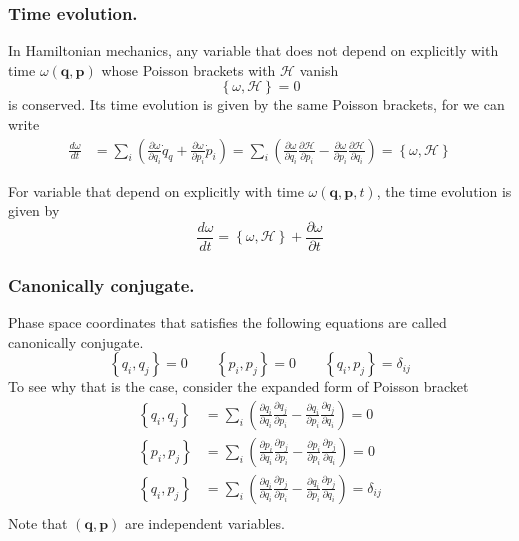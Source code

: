 \documentclass[../../../main.tex]{subfiles}
\begin{document}
\subsubsection{Time evolution.}
In Hamiltonian mechanics, any variable that does not depend on explicitly with time $\omega(\mathbf{q},\mathbf{p}) 	$ whose Poisson brackets with $\mathcal{H }$ vanish
\begin{equation*}
	\left\{ \omega,\mathcal{H } \right\}=0
\end{equation*}
is conserved.
Its time evolution is given by the same Poisson brackets, for we can write
\begin{align*}
	\frac{d \omega}{dt} & = \sum_i \left( \frac{\partial \omega }{\partial q_i }\dot{q}_q+\frac{\partial \omega }{\partial p_i}\dot{p}_i \right) = \sum_i \left( \frac{\partial \omega }{\partial q_i }\frac{\partial \mathcal{H}}{\partial p_i 	}-\frac{\partial\omega }{\partial p_i }\frac{\partial \mathcal{H }}{\partial q_i } \right) =\left\{ \omega,\mathcal{H} \right\}
\end{align*}

For variable that depend on explicitly with time $\omega(\mathbf{q}, \mathbf{p },t )$, the time evolution is given by
\begin{equation*}
	\frac{d \omega }{dt}=\left\{ \omega,\mathcal{H } \right\}+\frac{\partial \omega }{\partial t}
\end{equation*}

\subsubsection{Canonically conjugate.}
Phase space coordinates that satisﬁes the following equations are called canonically conjugate.
\begin{equation*}
	\left\{ q_i,q_j  \right\}=0\qquad \left\{ p_i,p_j  \right\}=0\qquad \left\{ q_i,p_j  \right\}=\delta_{ij}
\end{equation*}
To see why that is the case, consider the expanded form of Poisson bracket
\begin{align*}
	\left\{ q_i,q_j  \right\} & = \sum_i \left( \frac{\partial q_i}{\partial q_i }\frac{\partial q_j }{\partial p_i }-\frac{\partial q_i }{\partial p_i }\frac{\partial q_j }{\partial q_i} \right) =0           \\
	\left\{ p_i,p_j  \right\} & = \sum_i \left( \frac{\partial p_i}{\partial q_i }\frac{\partial p_j }{\partial p_i }-\frac{\partial p_i }{\partial p_i }\frac{\partial p_j }{\partial q_i} \right) =0           \\
	\left\{ q_i,p_j  \right\} & = \sum_i \left( \frac{\partial q_i}{\partial q_i }\frac{\partial p_j }{\partial p_i }-\frac{\partial q_i }{\partial p_i }\frac{\partial p_j }{\partial q_i} \right) =\delta_{ij} \\
\end{align*}
Note that $(\mathbf{q },\mathbf{p })$ are independent variables.
\end{document}
